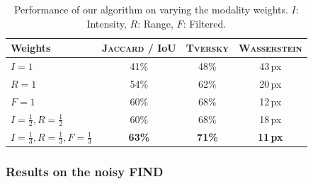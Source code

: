 \documentclass[conference]{IEEEtran}
\begin{document}
\begin{table}[!h]
    \centering
    \caption{Performance of our algorithm on varying the modality weights. $I$: Intensity, $R$: Range, $F$: Filtered.}
    \label{tab:ResultatsAblation}
    \begin{tabular}{lccc}
        \toprule
        Weights & \textsc{Jaccard} / IoU & \textsc{Tversky} &  \textsc{Wasserstein} \\
        \midrule
        $I=1$  & 41\% & 48\% &  43\,px\\
        \midrule
        $R=1$  & 54\% & 62\% &  20\,px \\
        \midrule
        $F=1$  & 60\% & 68\% &  12\,px \\
        \midrule
        $I=\tfrac12, R=\tfrac12$  & 60\% & 68\% & 18\,px \\
        \midrule
        $I=\tfrac13, R=\tfrac13, F=\tfrac13$  &  \textbf{63\%} &  \textbf{71\%}&\textbf{11\,px}  \\
        \bottomrule
    \end{tabular}
\end{table}







\subsubsection{Results on the noisy FIND}
\end{document}
